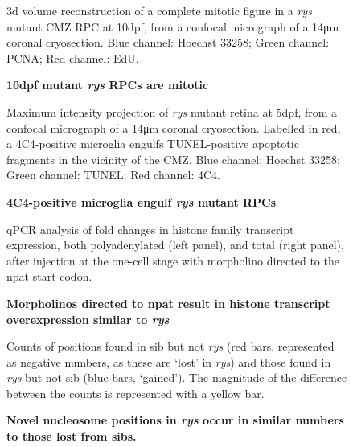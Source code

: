 \begin{figure}[!h]
    \caption{{\bf 10dpf mutant \textit{rys} RPCs are mitotic}} 3d volume reconstruction of a complete mitotic figure in a \textit{rys} mutant CMZ RPC at 10dpf, from a confocal micrograph of a 14\si{\micro\metre} coronal cryosection. Blue channel: Hoechst 33258; Green channel: PCNA; Red channel: EdU.
    \label{rysmitosis}
\end{figure}

\begin{figure}[!h]
    \caption{{\bf 4C4-positive microglia engulf \textit{rys} mutant RPCs}}
    Maximum intensity projection of \textit{rys} mutant retina at 5dpf, from a confocal micrograph of a 14\si{\micro\metre} coronal cryosection. Labelled in red, a 4C4-positive microglia engulfs TUNEL-positive apoptotic fragments in the vicinity of the CMZ. Blue channel: Hoechst 33258; Green channel: TUNEL; Red channel: 4C4.
    \label{phagocytosis}
\end{figure}


\begin{figure}[!h]
    \caption{{\bf Morpholinos directed to npat result in histone transcript overexpression similar to \textit{rys}}}
    qPCR analysis of fold changes in histone family transcript expression, both polyadenylated (left panel), and total (right panel), after injection at the one-cell stage with morpholino directed to the npat start codon.
    \label{morpholinoRTPCR}
\end{figure}

\begin{figure}[!h]
    \caption{{\bf Novel nucleosome positions in \textit{rys} occur in similar numbers to those lost from sibs.}}
    Counts of positions found in sib but not \textit{rys} (red bars, represented as negative numbers, as these are `lost' in \textit{rys}) and those found in \textit{rys} but not sib (blue bars, `gained'). The magnitude of the difference between the counts is represented with a yellow bar.
    \label{diffposdist}
\end{figure}

